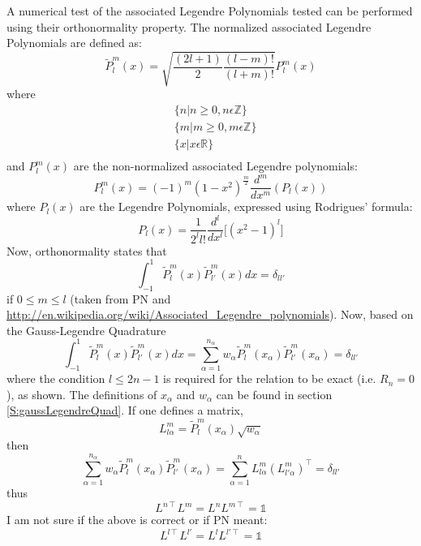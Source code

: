 \documentclass{revtex4-1}
\begin{document}
A numerical test of the associated Legendre Polynomials tested can be performed using their orthonormality property. The normalized associated Legendre Polynomials are defined as:
\begin{equation}
\widetilde{P}^{m}_{l}(x) = \sqrt{\frac{\left(2l+1\right)}{2}\frac{\left(l-m\right)!}{\left(l+m\right)!}} P^{m}_{l}(x)
\end{equation}
where
\begin{align*}
&\{n | n \geq0, n \epsilon \mathbb{Z} \}\\
&\{m | m \geq0, m \epsilon \mathbb{Z} \}\\
&\{x | x \epsilon \mathbb{R} \}\\
\end{align*}
and $P^{m}_{l}(x)$ are the non-normalized associated Legendre polynomials:
\begin{equation}
P^{m}_{l}\left(x\right)=\left(-1\right)^{m}\left(1-x^{2}\right)^{\frac{m}{2}}\frac{d^{m}}{dx^{m}}\left(P_{l}\left(x\right)\right)
\end{equation}
where $P_{l}\left(x\right)$ are the Legendre Polynomials, expressed using Rodrigues' formula:
\begin{equation}
P_{l}\left(x\right)=\frac{1}{2^{l}l!}\frac{d^{l}}{dx^{l}}\lbrack\left(x^{2}-1\right)^{l}\rbrack
\end{equation} 
Now, orthonormality states that
\begin{equation}
\int_{-1}^{1} \widetilde{P}^{m}_{l}(x) \widetilde{P}^{m}_{l'}(x) dx =  \delta_{ll'}
\end{equation}
if $0 \leq m \leq l$ (taken from PN and \url{http://en.wikipedia.org/wiki/Associated_Legendre_polynomials}).
Now, based on the Gauss-Legendre Quadrature
\begin{equation}
\int_{-1}^{1} \widetilde{P}^{m}_{l}(x) \widetilde{P}^{m}_{l'}(x) dx = \sum_{\alpha=1}^{n_{\alpha}}w_{\alpha}\widetilde{P}^{m}_{l}(x_{\alpha})\widetilde{P}^{m}_{l'}(x_{\alpha}) = \delta_{ll'}
\end{equation}
where the condition $l \leq 2n-1$ is required for the relation to be exact (i.e. $R_{n}=0$), as shown. The definitions of $x_{\alpha}$ and $w_{\alpha}$ can be found in section \ref{S:gaussLegendreQuad}. If one defines a matrix,
\begin{equation}
L^{m}_{l \alpha} = \widetilde{P}^{m}_{l}(x_{\alpha})\sqrt{w_{\alpha}}
\end{equation}
then
\begin{equation}
\sum_{\alpha=1}^{n_{\alpha}}w_{\alpha}\widetilde{P}^{m}_{l}(x_{\alpha})\widetilde{P}^{m}_{l'}(x_{\alpha}) = \sum_{\alpha=1}^{n}L^{m}_{l \alpha}(L^{m}_{l' \alpha})^{\intercal} = \delta_{ll'}
\end{equation}
thus
\begin{equation}
L^{n\intercal}L^{m} = L^{n}L^{m\intercal} = \mathbb{1}
\end{equation}
I am not sure if the above is correct or if PN meant: 
\begin{equation}
L^{l\intercal}L^{l'} = L^{l}L^{l'\intercal} = \mathbb{1}
\end{equation}
\end{document}
